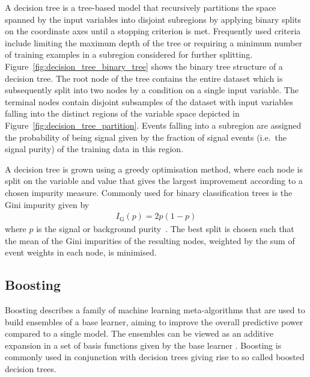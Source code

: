 A decision tree is a tree-based model that recursively partitions the space
spanned by the input variables into disjoint subregions by applying binary
splits on the coordinate axes until a stopping criterion is met. Frequently used
criteria include limiting the maximum depth of the tree or requiring a minimum
number of training examples in a subregion considered for further splitting.
Figure~\ref{fig:decision_tree_binary_tree} shows the binary tree structure of a
decision tree. The root node of the tree contains the entire dataset which is
subsequently split into two nodes by a condition on a single input variable. The
terminal nodes contain disjoint subsamples of the dataset with input variables
falling into the distinct regions of the variable space depicted in
Figure~\ref{fig:decision_tree_partition}. Events falling into a subregion are
assigned the probability of being signal given by the fraction of signal events
(i.e.\ the signal purity) of the training data in this region.

A decision tree is grown using a greedy optimisation method, where each node is
split on the variable and value that gives the largest improvement according to
a chosen impurity measure. Commonly used for binary classification trees is the
Gini impurity given by
\begin{align*}
  I_\text{G}(p) = 2 p (1 - p)
\end{align*}
where $p$ is the signal or background purity~\cite{esl}. The best split is
chosen such that the mean of the Gini impurities of the resulting nodes,
weighted by the sum of event weights in each node, is minimised.

\subsection{Boosting}
\label{sec:ml_boosting}

Boosting describes a family of machine learning meta-algorithms that are used to
build ensembles of a base learner, aiming to improve the overall predictive
power compared to a single model. The ensembles can be viewed as an additive
expansion in a set of basis functions given by the base learner \cite{esl}.
Boosting is commonly used in conjunction with decision trees giving rise to so
called boosted decision trees.

